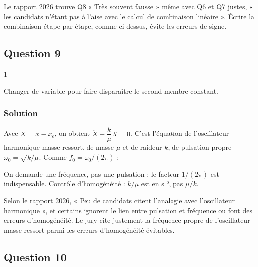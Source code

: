 \documentclass[11pt,a4paper]{article}
\newcommand{\equationajustee}[1]{%
  \sbox{\boiteequation}{$\displaystyle #1$}%
  \ifdim\wd\boiteequation>\linewidth
    \[\resizebox{\linewidth}{!}{\usebox{\boiteequation}}\]%
  \else
    \[#1\]%
  \fi}
\begin{document}
\begin{jury}

Le rapport 2026 trouve Q8 « Très souvent fausse » même avec Q6 et Q7 justes, « les candidats n'étant pas à l'aise avec le calcul de combinaison linéaire ». Écrire la combinaison étape par étape, comme ci-dessus, évite les erreurs de signe.

\end{jury}

\hypertarget{question-9}{%
\subsection{Question 9}\label{question-9}}

\begin{indication}{1}

Changer de variable pour faire disparaître le second membre constant.

\end{indication}

\hypertarget{solution-8}{%
\subsubsection{Solution}\label{solution-8}}

Avec \(X=x-x_e\), on obtient \(\ddot X+\dfrac k\mu X=0\). C'est l'équation de l'oscillateur harmonique masse-ressort, de masse \(\mu\) et de raideur \(k\), de pulsation propre \(\omega_0=\sqrt{k/\mu}\). Comme \(f_0=\omega_0/(2\pi)\) :
\equationajustee{\boxed{f_0=\frac1{2\pi}\sqrt{\frac k\mu}}}

\begin{piege}

On demande une fréquence, pas une pulsation : le facteur \(1/(2\pi)\) est indispensable. Contrôle d'homogénéité : \(k/\mu\) est en s⁻², pas \(\mu/k\).

\end{piege}

\begin{jury}

Selon le rapport 2026, « Peu de candidats citent l'analogie avec l'oscillateur harmonique », et certains ignorent le lien entre pulsation et fréquence ou font des erreurs d'homogénéité. Le jury cite justement la fréquence propre de l'oscillateur masse-ressort parmi les erreurs d'homogénéité évitables.

\end{jury}

\hypertarget{question-10}{%
\subsection{Question 10}\label{question-10}}
\end{document}
